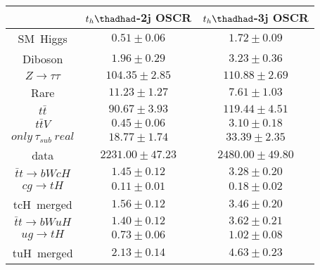 \centering
\begin{tabular}{ccc} \toprule\toprule
 & $t_{h}\thadhad$-2j OSCR & $t_{h}\thadhad$-3j OSCR\\  \midrule
SM~Higgs & $0.51\pm0.06$ & $1.72\pm0.09$\\
Diboson & $1.96\pm0.29$ & $3.23\pm0.36$\\
$Z\to\tau\tau$ & $104.35\pm2.85$ & $110.88\pm2.69$\\
Rare & $11.23\pm1.27$ & $7.61\pm1.03$\\
$t\bar{t}$ & $90.67\pm3.93$ & $119.44\pm4.51$\\
$t\bar{t}V$ & $0.45\pm0.06$ & $3.10\pm0.18$\\
$only~\tau_{sub}~real$ & $18.77\pm1.74$ & $33.39\pm2.35$\\
data & $2231.00\pm47.23$ & $2480.00\pm49.80$\\
$\bar{t}t\to bWcH$ & $1.45\pm0.12$ & $3.28\pm0.20$\\
$cg\to tH$ & $0.11\pm0.01$ & $0.18\pm0.02$\\
tcH~merged & $1.56\pm0.12$ & $3.46\pm0.20$\\
$\bar{t}t\to bWuH$ & $1.40\pm0.12$ & $3.62\pm0.21$\\
$ug\to tH$ & $0.73\pm0.06$ & $1.02\pm0.08$\\
tuH~merged & $2.13\pm0.14$ & $4.63\pm0.23$\\
\bottomrule\bottomrule
\end{tabular}
